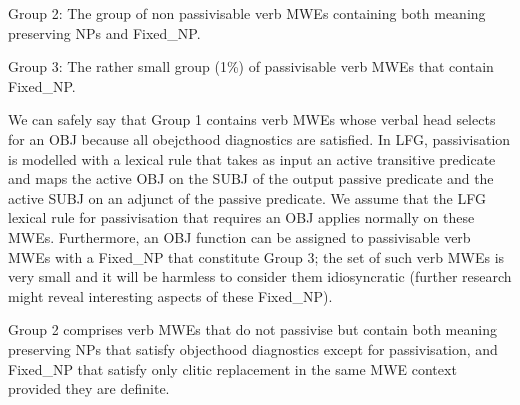 \documentclass[output=paper]{langsci/langscibook}
\begin{document}
Group 2: The group of non passivisable verb MWEs  containing both meaning preserving NPs and Fixed\_NP.



Group 3: The rather small group (1\%) of passivisable verb MWEs that contain Fixed\_NP.


We can safely say that Group 1 contains verb MWEs whose verbal head selects
for an OBJ because all obejcthood diagnostics are satisfied. In  LFG, passivisation
 is modelled with a  lexical rule that takes as input an active transitive predicate
and maps the active OBJ on the SUBJ of the output passive predicate and the active SUBJ on
an adjunct of the passive predicate. We  assume that the LFG lexical rule
for passivisation that requires an OBJ applies normally on these MWEs.
Furthermore, an OBJ function can be assigned to passivisable verb MWEs with a Fixed\_NP that constitute Group 3; the set of such verb MWEs is very small and it will be harmless to consider them idiosyncratic (further research might reveal interesting aspects of these Fixed\_NP). 

Group 2 comprises verb MWEs that do not passivise but contain both meaning preserving NPs that satisfy objecthood diagnostics except for passivisation, and Fixed\_NP that satisfy only clitic replacement in the same MWE context provided they are definite.  
\end{document}
